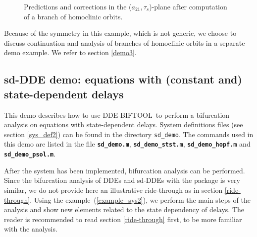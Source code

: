 \documentclass[10pt]{scrartcl}
\newcommand{\DDEBIFCODE}{\textsc{DDE-BIFTOOL}}
\newcommand{\file}[1]{\textbf{\texttt{#1}}}
\begin{document}
\begin{figure}[h]
\begin{center}
\end{center}
\caption{\label{ride15_pic}Predictions and corrections in the 
($a_{21},\tau_s$)-plane after computation of a branch of homoclinic 
orbits.}
\end{figure}
Because of the symmetry in this example, which is not generic, we choose to 
discuss continuation and analysis of branches of homoclinic orbits in a 
separate demo example.  We refer to section \ref{demo3}.

\subsection{sd-DDE demo: equations with (constant and) 
state-dependent delays}\label{demo2} 
This demo describes how to use \DDEBIFCODE\ to perform a bifurcation
analysis on equations with state-dependent delays.  System definitions
files (see section \ref{sys_def2}) can be found in the directory
\verb$sd_demo$.  The commands used in this demo are listed in the file
\file{sd\_demo.m}, \file{sd\_demo\_stst.m}, \file{sd\_demo\_hopf.m}
and \file{sd\_demo\_psol.m}.

After the system has been implemented, bifurcation analysis can be
performed.  Since the bifurcation analysis of DDEs and sd-DDEs with
the package is very similar, we do not provide here an illustrative
ride-through as in section \ref{ride-through}.  Using the
example~(\ref{example_sys2}), we perform the main steps of the
analysis and show new elements related to the state dependency of
delays.  The reader is recommended to read section \ref{ride-through}
first, to be more familiar with the analysis.
\end{document}
